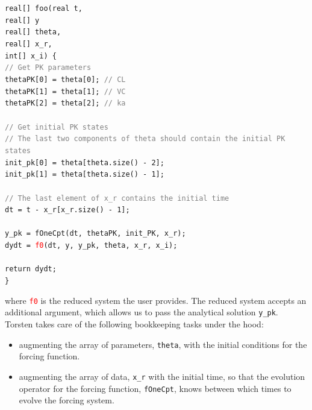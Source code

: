 \documentclass[11pt]{amsart}
\begin{document}
\texttt{real[] foo(real t, \\
\phantom{real[] foo(}real[] y \\
\phantom{real[] foo(}real[] theta,  \\
\phantom{real[] foo(}real[] x\_r, \\
\phantom{real[] foo(}int[] x\_i) \{ \\
%
 \phantom{  } \textcolor{gray}{// Get PK parameters} \\
 \phantom{  } thetaPK[0] = theta[0];  \textcolor{gray}{// CL} \\
 \phantom{  } thetaPK[1] = theta[1];  \textcolor{gray}{// VC} \\
 \phantom{  } thetaPK[2] = theta[2];  \textcolor{gray}{// ka} \\ \ \\
% 
 \phantom{  } \textcolor{gray}{// Get initial PK states} \\
 \phantom{  } \textcolor{gray}{// The last two components of theta should contain the initial PK states} \\
 \phantom{  }  init\_pk[0] = theta[theta.size() - 2]; \\
 \phantom{  }  init\_pk[1] = theta[theta.size() - 1]; \\ \ \\
%  
 \phantom{  }  \textcolor{gray}{// The last element of x\_r contains the initial time} \\
 \phantom{  }  dt = t - x\_r[x\_r.size() - 1]; \\ \ \\
% 
 \phantom{  }  y\_pk = fOneCpt(dt, thetaPK, init\_PK, x\_r); \\
 \phantom{  }  dydt = \textcolor{red}{f0}(dt, y, y\_pk, theta, x\_r, x\_i); \\ \ \\
%  
 \phantom{  }  return dydt; \\
\}
}
  
where \texttt{\textcolor{red}{f0}} is the reduced system the user provides. The reduced 
system accepts an additional argument, which allows us to pass the analytical solution \texttt{y\_pk}. 
Torsten takes care of the following bookkeeping tasks under the hood:
\begin{itemize}
  \item augmenting the array of parameters, \texttt{theta}, with the initial conditions for the forcing function.
  \item augmenting the array of data, \texttt{x\_r} with the initial time, so that the evolution operator
  for the forcing function, \texttt{fOneCpt}, knows between which times to evolve the forcing system.
\end{itemize}
\end{document}
